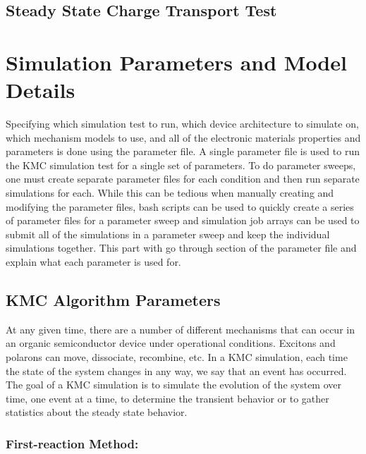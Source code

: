 \documentclass[%
 reprint,onecolumn,notitlepage,
superscriptaddress,longbibliography,
 amsmath,amssymb,
 aps,rmp,floatfix,
]{revtex4-1}
\begin{document}
\subsection{Steady State Charge Transport Test}

\section{Simulation Parameters and Model Details}

Specifying which simulation test to run, which device architecture to simulate on, which mechanism models to use, and all of the electronic materials properties and parameters is done using the parameter file.
A single parameter file is used to run the KMC simulation test for a single set of parameters.
To do parameter sweeps, one must create separate parameter files for each condition and then run separate simulations for each.
While this can be tedious when manually creating and modifying the parameter files, bash scripts can be used to quickly create a series of parameter files for a parameter sweep and simulation job arrays can be used to submit all of the simulations in a parameter sweep and keep the individual simulations together.
This part with go through section of the parameter file and explain what each parameter is used for.

\subsection{KMC Algorithm Parameters}\label{sub:KMC_algorithms}

At any given time, there are a number of different mechanisms that can occur in an organic semiconductor device under operational conditions. 
Excitons and polarons can move, dissociate, recombine, etc. 
In a KMC simulation, each time the state of the system changes in any way, we say that an event has occurred. The goal of a KMC simulation is to simulate the evolution of the system over time, one event at a time, to determine the transient behavior or to gather statistics about the steady state behavior.

\subsubsection{First-reaction Method:}
\end{document}
